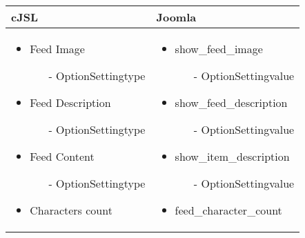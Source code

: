 \begin{minipage}{0.63\textwidth}
\begin{tabular}{|p{} | p{}|}
\hline
\textbf{cJSL} & \textbf{Joomla} \\ 
\hline
\begin{itemize}
\item Feed Image
\begin{enumerate}
    \item[-] OptionSettingtype
 \end{enumerate}  
\item Feed Description
\begin{enumerate}
    \item[-] OptionSettingtype
 \end{enumerate}  
\item Feed Content
\begin{enumerate}
    \item[-] OptionSettingtype
 \end{enumerate}  
\item Characters count 
 \end{itemize}
 &
 \begin{itemize}
\item show\_feed\_image
\begin{enumerate}
    \item[-] OptionSettingvalue
 \end{enumerate} 
\item show\_feed\_description
\begin{enumerate}
    \item[-] OptionSettingvalue
 \end{enumerate}  
\item show\_item\_description
\begin{enumerate}
    \item[-] OptionSettingvalue
 \end{enumerate}  
\item feed\_character\_count 
 \end{itemize} 
\\
\hline
\end{tabular}
\end{minipage}

